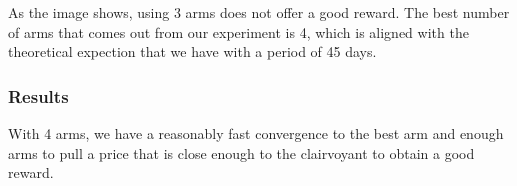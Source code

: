 As the image shows, using 3 arms does not offer a good reward. The best number of arms that comes out from our experiment is 4, which is aligned with the theoretical expection that we have with a period of 45 days.

\subsubsection{Results}
With 4 arms, we have a reasonably fast convergence to the best arm and enough arms to pull a price that is close enough to the clairvoyant to obtain a good reward.